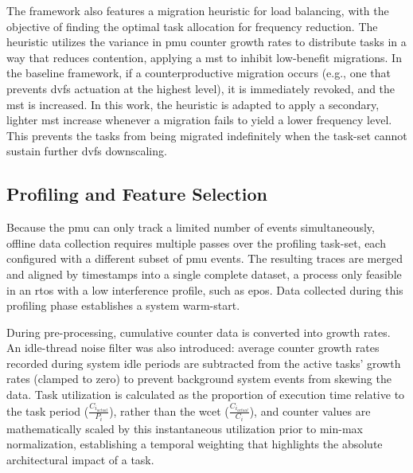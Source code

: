 \documentclass[journal]{IEEEtran}
\begin{document}
The framework also features a migration heuristic for load balancing, with the objective of finding the optimal task allocation for frequency reduction. The heuristic utilizes the variance in \gls{pmu} counter growth rates to distribute tasks in a way that reduces contention, applying a \gls{mst} to inhibit low-benefit migrations. In the baseline framework, if a counterproductive migration occurs (e.g., one that prevents \gls{dvfs} actuation at the highest level), it is immediately revoked, and the \gls{mst} is increased. In this work, the heuristic is adapted to apply a secondary, lighter \gls{mst} increase whenever a migration fails to yield a lower frequency level. This prevents the tasks from being migrated indefinitely when the task-set cannot sustain further \gls{dvfs} downscaling.

\subsection{Profiling and Feature Selection}

Because the \gls{pmu} can only track a limited number of events simultaneously, offline data collection requires multiple passes over the profiling task-set, each configured with a different subset of \gls{pmu} events. The resulting traces are merged and aligned by timestamps into a single complete dataset, a process only feasible in an \gls{rtos} with a low interference profile, such as \gls{epos}. Data collected during this profiling phase establishes a system warm-start.

During pre-processing, cumulative counter data is converted into growth rates. An idle-thread noise filter was also introduced: average counter growth rates recorded during system idle periods are subtracted from the active tasks' growth rates (clamped to zero) to prevent background system events from skewing the data. Task utilization is calculated as the proportion of execution time relative to the task period ($\frac{C_{i_{actual}}}{P_i}$), rather than the \gls{wcet} ($\frac{C_{i_{actual}}}{C_i}$), and counter values are mathematically scaled by this instantaneous utilization prior to min-max normalization, establishing a temporal weighting that highlights the absolute architectural impact of a task.
\end{document}
